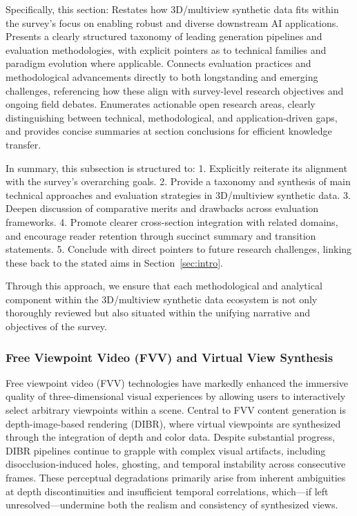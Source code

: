 \documentclass[sigconf]{acmart}
\begin{document}
Specifically, this section:
Restates how 3D/multiview synthetic data fits within the survey’s focus on enabling robust and diverse downstream AI applications.
Presents a clearly structured taxonomy of leading generation pipelines and evaluation methodologies, with explicit pointers as to technical families and paradigm evolution where applicable.
Connects evaluation practices and methodological advancements directly to both longstanding and emerging challenges, referencing how these align with survey-level research objectives and ongoing field debates.
Enumerates actionable open research areas, clearly distinguishing between technical, methodological, and application-driven gaps, and provides concise summaries at section conclusions for efficient knowledge transfer.

In summary, this subsection is structured to:
1. Explicitly reiterate its alignment with the survey’s overarching goals.
2. Provide a taxonomy and synthesis of main technical approaches and evaluation strategies in 3D/multiview synthetic data.
3. Deepen discussion of comparative merits and drawbacks across evaluation frameworks.
4. Promote clearer cross-section integration with related domains, and encourage reader retention through succinct summary and transition statements.
5. Conclude with direct pointers to future research challenges, linking these back to the stated aims in Section~\ref{sec:intro}.

Through this approach, we ensure that each methodological and analytical component within the 3D/multiview synthetic data ecosystem is not only thoroughly reviewed but also situated within the unifying narrative and objectives of the survey.

\subsubsection{Free Viewpoint Video (FVV) and Virtual View Synthesis}

Free viewpoint video (FVV) technologies have markedly enhanced the immersive quality of three-dimensional visual experiences by allowing users to interactively select arbitrary viewpoints within a scene. Central to FVV content generation is depth-image-based rendering (DIBR), where virtual viewpoints are synthesized through the integration of depth and color data. Despite substantial progress, DIBR pipelines continue to grapple with complex visual artifacts, including disocclusion-induced holes, ghosting, and temporal instability across consecutive frames. These perceptual degradations primarily arise from inherent ambiguities at depth discontinuities and insufficient temporal correlations, which—if left unresolved—undermine both the realism and consistency of synthesized views.
\end{document}
